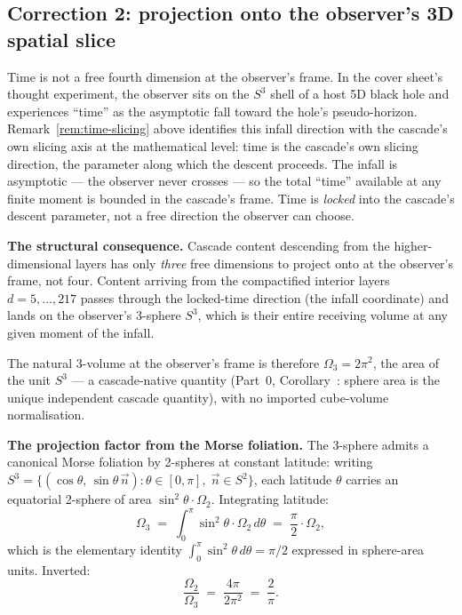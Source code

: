 \documentclass[11pt,a4paper]{article}
\begin{document}
\subsection{Correction 2: projection onto the observer's 3D spatial slice}\label{subsec:correction2}

Time is not a free fourth dimension at the observer's frame. In the
cover sheet's thought experiment, the observer sits on the $S^3$ shell of a
host 5D black hole and experiences ``time'' as the asymptotic fall
toward the hole's pseudo-horizon. Remark~\ref{rem:time-slicing} above
identifies this infall direction with the cascade's own slicing axis
at the mathematical level: time is the cascade's own slicing
direction, the parameter along which the descent proceeds. The infall
is asymptotic --- the observer never crosses --- so the total ``time''
available at any finite moment is bounded in the cascade's frame.
Time is \emph{locked} into the cascade's descent parameter, not a
free direction the observer can choose.

\medskip\noindent\textbf{The structural consequence.}
Cascade content descending from the higher-dimensional layers has only
\emph{three} free dimensions to project onto at the observer's frame,
not four. Content arriving from the compactified interior layers
$d = 5, \ldots, 217$ passes through the locked-time direction (the
infall coordinate) and lands on the observer's 3-sphere $S^3$, which is
their entire receiving volume at any given moment of the infall.

The natural 3-volume at the observer's frame is therefore
$\Omega_3 = 2\pi^2$, the area of the unit $S^3$ --- a cascade-native
quantity (Part~0, Corollary~: sphere area is the unique independent
cascade quantity), with no imported cube-volume normalisation.

\medskip\noindent\textbf{The projection factor from the Morse foliation.}
The 3-sphere admits a canonical Morse foliation by 2-spheres at constant
latitude: writing $S^3 = \{(\cos\theta,\, \sin\theta\,\vec n) :
\theta\in[0,\pi],\; \vec n\in S^2\}$, each latitude $\theta$ carries an
equatorial 2-sphere of area $\sin^2\theta \cdot \Omega_2$. Integrating
latitude:
\[
\Omega_3 \;=\; \int_0^\pi \sin^2\theta\cdot\Omega_2 \, d\theta \;=\; \frac{\pi}{2}\cdot\Omega_2,
\]
which is the elementary identity
$\int_0^\pi \sin^2\theta\,d\theta = \pi/2$ expressed in sphere-area
units. Inverted:
\[
\frac{\Omega_2}{\Omega_3} \;=\; \frac{4\pi}{2\pi^2} \;=\; \frac{2}{\pi}.
\]
\end{document}
